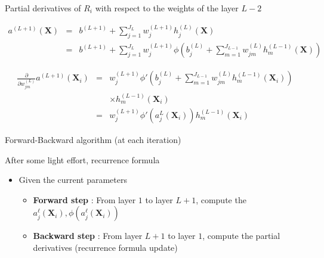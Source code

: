 \documentclass[compress,10pt]{beamer}
\begin{document}
\begin{frame}{Partial derivatives of \(R_i\) with respect to the weights
of the layer \(L-2\)}
\protect\hypertarget{partial-derivatives-of-r_i-with-respect-to-the-weights-of-the-layer-l-2}{}

\begin{eqnarray*}
a^{(L+1)}(\mathbf{X}) &=&  b^{(L+1)} + \sum_{j=1}^{J_L} w^{(L+1)}_j h_j^{(L)}(\mathbf{X}) \\
&=&  b^{(L+1)} + \sum_{j=1}^{J_L}  w^{(L+1)}_j \phi \left(b_j^{(L)} + \sum_{m=1}^{J_{L-1}} w^{(L)}_{jm} h_m^{(L-1)}(\mathbf{X})\right)
\end{eqnarray*}

\begin{eqnarray*}
\frac{\partial}{\partial w^{(L)}_{jm}}  a^{(L+1)}(\mathbf{X}_i)  &=&   w^{(L+1)}_j \phi' \left(b_j^{(L)} + \sum_{m=1}^{J_{L-1}} w^{(L)}_{jm} h_m^{(L-1)}(\mathbf{X}_i)\right) \\
&& \times h_m^{(L-1)}(\mathbf{X}_i)   \\
&=& w^{(L+1)}_j \phi'(a_j^{L}(\mathbf{X}_i)) h_m^{(L-1)}(\mathbf{X}_i)
\end{eqnarray*}

\end{frame}
\begin{frame}{Forward-Backward algorithm (at each iteration)}
\protect\hypertarget{forward-backward-algorithm-at-each-iteration}{}

After some light effort, recurrence formula

\begin{itemize}

\item
  Given the current parameters

  \begin{itemize}
  
  \item
    \textbf{Forward step} : From layer \(1\) to layer \(L+1\), compute
    the \(a_j^{\ell}(\mathbf{X}_i),\phi(a_j^{\ell}(\mathbf{X}_i))\)\\
  \item
    \textbf{Backward step } : From layer \(L+1\) to layer \(1\), compute
    the partial derivatives (recurrence formula update)
  \end{itemize}
\end{itemize}

\end{frame}
\end{document}
